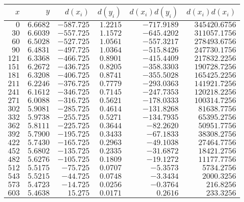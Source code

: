 \begin{tabular}{rrrrrr} \toprule
$x$    & $y$      & $d(x_i)$   & $d(y_i)$  & $d(x_i)d(y_i)$ & $d(x_i)d(x_i)$ \\\midrule
$0$    & $6.6682$ & $-587.725$ & $1.2215$  & $-717.9189$   & $345420.6756$  \\
$30$   & $6.6039$ & $-557.725$ & $1.1572$  & $-645.4202$   & $311057.1756$  \\
$60$   & $6.5028$ & $-527.725$ & $1.0561$  & $-557.3217$   & $278493.6756$  \\
$90$   & $6.4831$ & $-497.725$ & $1.0364$  & $-515.8426$   & $247730.1756$  \\
$121$  & $6.3368$ & $-466.725$ & $0.8901$  & $-415.4409$   & $217832.2256$  \\
$151$  & $6.2672$ & $-436.725$ & $0.8205$  & $-358.3303$   & $190728.7256$  \\
$181$  & $6.3208$ & $-406.725$ & $0.8741$  & $-355.5028$   & $165425.2256$  \\
$211$  & $6.2246$ & $-376.725$ & $0.7779$  & $-293.0363$   & $141921.7256$  \\
$241$  & $6.1612$ & $-346.725$ & $0.7145$  & $-247.7353$   & $120218.2256$  \\
$271$  & $6.0088$ & $-316.725$ & $0.5621$  & $-178.0333$   & $100314.7256$  \\
$302$  & $5.9081$ & $-285.725$ & $0.4614$  & $-131.8268$   & $81638.7756$   \\
$332$  & $5.9738$ & $-255.725$ & $0.5271$  & $-134.7935$   & $65395.2756$   \\
$362$  & $5.8111$ & $-225.725$ & $0.3644$  & $-82.2620$    & $50951.7756$   \\
$392$  & $5.7900$ & $-195.725$ & $0.3433$  & $-67.1833$    & $38308.2756$   \\
$422$  & $5.7430$ & $-165.725$ & $0.2963$  & $-49.1038$    & $27464.7756$   \\
$452$  & $5.6802$ & $-135.725$ & $0.2335$  & $-31.6872$    & $18421.2756$   \\
$482$  & $5.6276$ & $-105.725$ & $0.1809$  & $-19.1272$    & $11177.7756$   \\
$512$  & $5.5175$ & $-75.725$  & $0.0707$  & $-5.3573$     & $5734.2756$    \\
$543$  & $5.5215$ & $-44.725$  & $0.0748$  & $-3.3434$     & $2000.3256$    \\
$573$  & $5.4723$ & $-14.725$  & $0.0256$  & $-0.3764$     & $216.8256$     \\
$603$  & $5.4638$ & $15.275$   & $0.0171$  & $0.2616$      & $233.3256$     \\

\end{tabular}
